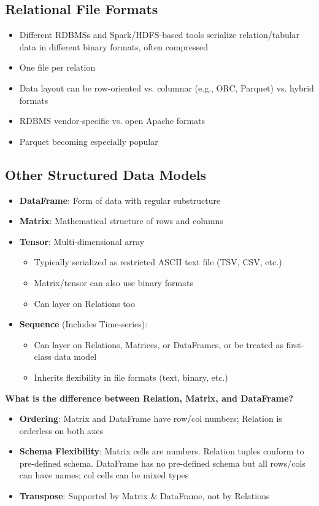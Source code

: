 \documentclass[12pt]{article}
\begin{document}
\subsection{Relational File Formats}
\begin{itemize}
    \item Different RDBMSs and Spark/HDFS-based tools serialize relation/tabular data in different binary formats, often compressed
    \item One file per relation
    \item Data layout can be row-oriented vs. columnar (e.g., ORC, Parquet) vs. hybrid formats
    \item RDBMS vendor-specific vs. open Apache formats
    \item Parquet becoming especially popular
\end{itemize}

\subsection{Other Structured Data Models}
\begin{itemize}
    \item \textbf{DataFrame}: Form of data with regular substructure
    \item \textbf{Matrix}: Mathematical structure of rows and columns
    \item \textbf{Tensor}: Multi-dimensional array
    \begin{itemize}
        \item Typically serialized as restricted ASCII text file (TSV, CSV, etc.)
        \item Matrix/tensor can also use binary formats
        \item Can layer on Relations too
    \end{itemize}
    \item \textbf{Sequence} (Includes Time-series):
    \begin{itemize}
        \item Can layer on Relations, Matrices, or DataFrames, or be treated as first-class data model
        \item Inherits flexibility in file formats (text, binary, etc.)
    \end{itemize}
\end{itemize}

\begin{tcolorbox}[colback=blue!5!white,colframe=blue!75!black,title={Comparing Structured Data Models}]
\textbf{What is the difference between Relation, Matrix, and DataFrame?}
\begin{itemize}
    \item \textbf{Ordering}: Matrix and DataFrame have row/col numbers; Relation is orderless on both axes
    \item \textbf{Schema Flexibility}: Matrix cells are numbers. Relation tuples conform to pre-defined schema. DataFrame has no pre-defined schema but all rows/cols can have names; col cells can be mixed types
    \item \textbf{Transpose}: Supported by Matrix \& DataFrame, not by Relations
\end{itemize}
\end{tcolorbox}
\end{document}
